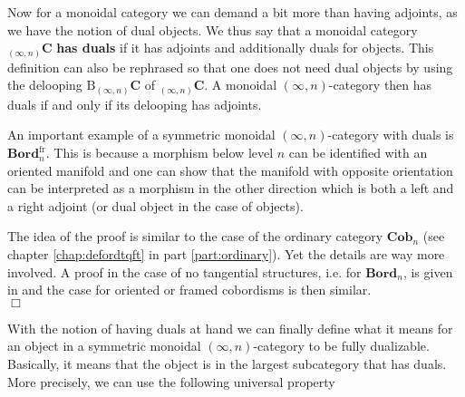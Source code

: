 Now for a monoidal category we can demand a bit more than having adjoints, as we have the notion of dual objects. We thus say that a monoidal category ${_{(\infty,n)}}\mathbf{C}$ \textbf{has duals} if it has adjoints and additionally duals for objects. This definition can also be rephrased so that one does not need dual objects by using the delooping $\mathrm{B}{_{(\infty,n)}}\mathbf{C}$ of ${_{(\infty,n)}}\mathbf{C}$. A monoidal $(\infty,n)$-category then has duals if and only if its delooping has adjoints.
\\
\begin{exa}
An important example of a symmetric monoidal $(\infty,n)$-category with duals is $\mathbf{Bord}_{n}^{\mathrm{fr}}$. This is because a morphism below level $n$ can be identified with an oriented manifold and one can show that the manifold with opposite orientation can be interpreted as a morphism in the other direction which is both a left and a right adjoint (or dual object in the case of objects).
\end{exa}
\begin{prf}
The idea of the proof is similar to the case of the ordinary category $\mathbf{Cob}_{n}$ (see chapter \ref{chap:defordtqft} in part \ref{part:ordinary}). Yet the details are way more involved. A proof in the case of no tangential structures, i.e. for $\mathbf{Bord}_{n}$, is given in \cite{47e8603a} and the case for oriented or framed cobordisms is then similar.
\\
\phantom{proven}
\hfill
$\Box$
\end{prf}
With the notion of having duals at hand we can finally define what it means for an object in a symmetric monoidal $(\infty,n)$-category to be fully dualizable. Basically, it means that the object is in the largest subcategory that has duals. More precisely, we can use the following universal property
\\

